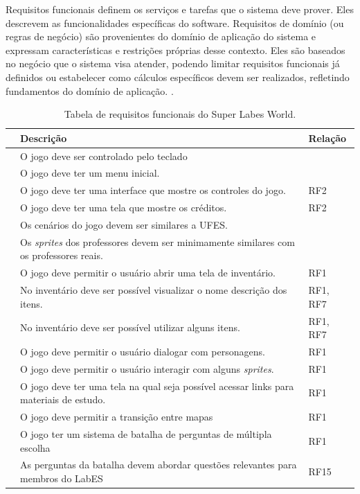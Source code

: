 Requisitos funcionais definem os serviços e tarefas que o sistema deve prover. Eles descrevem as funcionalidades específicas do software. Requisitos de domínio (ou regras de negócio) são
provenientes do domínio de aplicação do sistema e expressam características e restrições próprias desse contexto. Eles são baseados no negócio que o sistema visa atender, podendo limitar requisitos funcionais já definidos ou estabelecer como cálculos específicos devem ser realizados, refletindo fundamentos do domínio de aplicação. \cite{sommervilleengenharia}.

 
\begin{table}[h!]
	\caption{Tabela de requisitos funcionais do Super Labes World.}
	\label{tbl-requisitos-funcionais}
	\centering
	\renewcommand{\arraystretch}{2}
	\begin{small}
		\begin{tabular}{ | p{20mm} | p{102mm} | p{20mm} |}\hline \rowcolor{MidnightBlue}
			\centering{\textbf{Id}} & \textbf{Descrição} & \textbf{Relação} \\\hline		
                \centering{RF1} & O jogo deve ser controlado pelo teclado &  \\\hline
			\centering{RF2} & O jogo deve ter um menu inicial. &  \\\hline
                \centering{RF3} & O jogo deve ter uma interface que mostre os controles do jogo. & RF2 \\\hline
			\centering{RF4} & O jogo deve ter uma tela que mostre os créditos. & RF2 \\\hline
                \centering{RF5} & Os cenários do jogo devem ser similares a UFES. &  \\\hline
			\centering{RF6} & Os \textit{sprites} dos professores devem ser minimamente similares com os professores reais. &  \\\hline
			\centering{RF7} & O jogo deve permitir o usuário abrir uma tela de inventário. & RF1 \\\hline
			\centering{RF8} & No inventário deve ser possível visualizar o nome descrição dos itens. &  RF1, RF7\\\hline
			\centering{RF9} & No inventário deve ser possível utilizar alguns itens. & RF1, RF7  \\\hline
			\centering{RF10} & O jogo deve permitir o usuário dialogar com personagens. & RF1 \\\hline
			\centering{RF11} & O jogo deve permitir o usuário interagir com alguns \textit{sprites}. &  RF1\\\hline
			\centering{RF12} & O jogo deve ter uma tela na qual seja possível acessar links para materiais de estudo. &  RF1\\\hline
			\centering{RF13} & O jogo deve permitir a transição entre mapas & RF1 \\\hline
                \centering{RF14} & O jogo ter um sistema de batalha de perguntas de múltipla escolha &  RF1\\\hline
                \centering{RF15} & As perguntas da batalha devem abordar questões relevantes para membros do LabES &  RF15\\\hline


\end{tabular}
\end{small}
\end{table}
